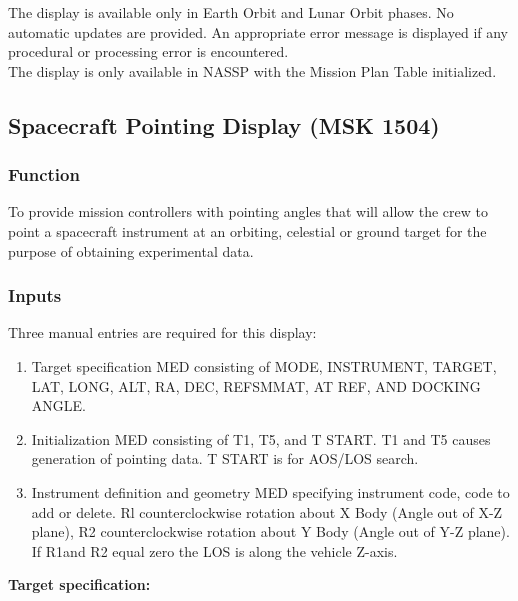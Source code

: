 \documentclass[11pt]{article} %
\begin{document}
The display is available only in Earth Orbit and Lunar Orbit phases. No automatic updates are provided. An appropriate error message is displayed if any
procedural or processing error is encountered.\\

The display is only available in NASSP with the Mission Plan Table initialized.\\
\newpage
\subsection{Spacecraft Pointing Display (MSK 1504)}
\subsubsection{Function}
To provide mission controllers with pointing angles that will allow the crew to point a spacecraft instrument at an orbiting, celestial or ground target for the purpose of obtaining experimental data.
\subsubsection{Inputs}
Three manual entries are required for this display:
\begin{enumerate}
\item Target specification MED consisting of MODE, INSTRUMENT, TARGET, LAT, LONG, ALT, RA, DEC, REFSMMAT, AT REF, AND DOCKING ANGLE.
\item Initialization MED consisting of T1, T5, and T START. T1 and T5 causes generation of pointing data. T START is for AOS/LOS search.
\item Instrument definition and geometry MED specifying instrument code, code to add or delete. Rl counterclockwise rotation about X Body (Angle out of X-Z plane), R2 counterclockwise rotation about Y Body (Angle out of Y-Z plane). If R1and R2 equal zero the LOS is along the vehicle Z-axis.
\end{enumerate}
\textbf{Target specification:}\\
\end{document}
